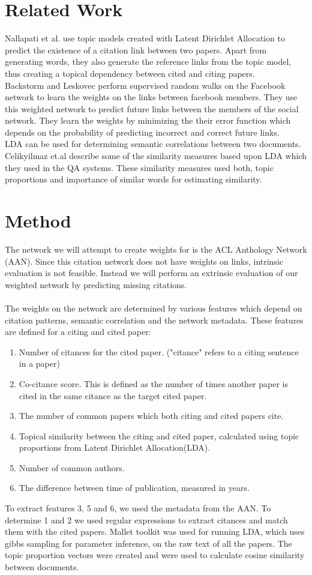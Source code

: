\documentclass{article} %
\begin{document}
\section{Related Work}
Nallapati et al. \cite{nallapati2008joint} use topic models created with Latent Dirichlet Allocation to predict the existence of a citation link between two papers. Apart from generating words, they also generate the reference links from the topic model, thus creating a topical dependency between cited and citing papers. \\
Backstorm and Leskovec \cite{Backstrom:2011:SRW:1935826.1935914} perform supervised random walks on the Facebook network to learn the weights on the links between facebook members. They use this weighted network to predict future links between the members of the social network. They learn the weights by minimizing the their error function which depends on the probability of predicting incorrect and correct future links. \\
LDA can be used for determining semantic correlations between two documents. Celikyilmaz et.al describe some of the similarity measures based upon LDA which they used in the QA systems. These similarity measures used both, topic proportions and importance of similar words for estimating similarity.
\section{Method}
The network we will attempt to create weights for is the ACL Anthology Network (AAN). Since this citation network does not have weights on links, intrinsic evaluation is not feasible. Instead we will perform an extrinsic evaluation of our weighted network by predicting missing citations.\\
\\
The weights on the network are determined by various features which depend on citation patterns, semantic correlation and the network metadata. These features are defined for a citing and cited paper:
\begin{enumerate}
  \item Number of citances for the cited paper. ("citance" refers to a citing sentence in a paper)
  \item Co-citance score. This is defined as the number of times another paper is cited in the same citance as the target cited paper.
  \item The number of common papers which both citing and cited papers cite.
  \item Topical similarity between the citing and cited paper, calculated using topic proportions from Latent Dirichlet Allocation(LDA).
  \item Number of common authors.
  \item The difference between time of publication, measured in years.
\end{enumerate}
To extract features 3, 5 and 6, we used the metadata from the AAN. To determine 1 and 2 we used regular expressions to extract citances and match them with the cited papers. Mallet toolkit was used for running LDA, which uses gibbs sampling for parameter inference, on the raw text of all the papers. The topic proportion vectors were created and were used to calculate cosine similarity between documents.
\end{document}
